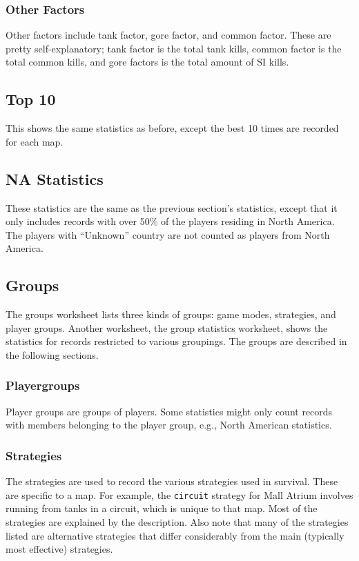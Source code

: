 \subsubsection{Other Factors}
Other factors include tank factor, gore factor, and common factor. These are pretty self-explanatory; tank factor is the total tank kills, common factor is the total common kills, and gore factors is the total amount of SI kills.

\subsection{Top 10}
This shows the same statistics as before, except the best 10 times are recorded for each map.

\subsection{NA Statistics}
These statistics are the same as the previous section's statistics, except that it only includes records with over 50\% of the players residing in North America. The players with ``Unknown'' country are not counted as players from North America.

\subsection{Groups} \label{sec:groups}
The groups worksheet lists three kinds of groups: game modes, strategies, and player groups. Another worksheet, the group statistics worksheet, shows the statistics for records restricted to various groupings. The groups are described in the following sections.

\subsubsection{Playergroups}
Player groups are groups of players. Some statistics might only count records with members belonging to the player group, e.g., North American statistics.

\subsubsection{Strategies}
The strategies are used to record the various strategies used in survival. These are specific to a map. For example, the \texttt{circuit} strategy for Mall Atrium involves running from tanks in a circuit, which is unique to that map. Most of the strategies are explained by the description. Also note that many of the strategies listed are alternative strategies that differ considerably from the main (typically most effective) strategies.

